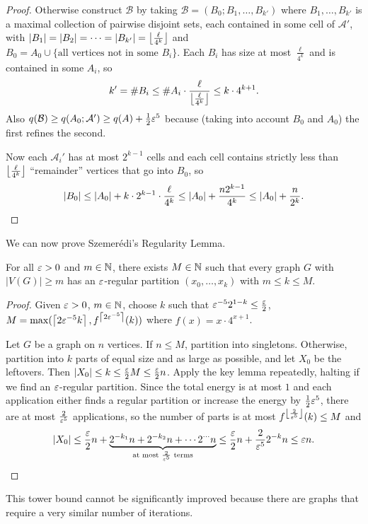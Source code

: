 \documentclass[main.tex]{subfiles}
\begin{document}
\begin{proof}
  Otherwise construct $\mathcal B$ by taking
  $\mathcal B = (B_0; B_1,\ldots,B_{k'})$ where $B_1,\ldots,B_{k'}$ is a maximal
  collection of pairwise disjoint sets, each contained in some cell of $\mathcal A'$,
  with $|B_1| = |B_2| = \cdots = |B_{k'}| = \left\lfloor \frac{\ell}{4^k} \right\rfloor$
  and $B_0 = A_0\cup\{\text{all vertices not in some $B_i$}\}$.
  Each $B_i$ has size at most $\frac{\ell}{4^k}$ and is contained in some
  $A_i$, so
  \[
    k' = \# B_i\leq\# A_i\cdot\frac{\ell}{\left\lfloor \frac{\ell}{4^k} \right\rfloor}
    \leq k\cdot 4^{k+1}.
  \]
  Also $q(\mathcal B)\geq q(A_0;\mathcal A')\geq q(A) + \frac{1}{2}\varepsilon^5$ because
  (taking into account $B_0$ and $A_0$) the first refines the second.

  Now each $\mathcal A_i'$ has at most $2^{k-1}$ cells and each cell contains
  strictly less than $\left\lfloor \frac{\ell}{4^k} \right\rfloor$ ``remainder'' vertices that go
  into $B_0$, so
  \[
    |B_0|\leq|A_0| + k\cdot 2^{k-1}\cdot\frac{\ell}{4^k}
    \leq |A_0| + \frac{n 2^{k-1}}{4^k}\leq|A_0| + \frac{n}{2^k}. \qedhere
  \]
\end{proof}
We can now prove Szemer\'edi's Regularity Lemma.
\begin{recall*}
  For all $\varepsilon > 0$ and $m\in\mathbb N$, there exists $M\in\mathbb N$ such that every graph
  $G$ with $|V(G)|\geq m$ has an $\varepsilon$-regular partition
  $(x_0,\ldots,x_k)$ with $m\leq k\leq M$.
\end{recall*}
\begin{proof}
  Given $\varepsilon > 0$, $m\in\mathbb N$, choose $k$ such that $\varepsilon^{-5}2^{1-k}\leq\frac{\varepsilon}{2}$,
  $M = \max(\left\lceil 2\varepsilon^{-5}k \right\rceil, f^{\left\lceil 2\varepsilon^{-5} \right\rceil}(k))$ where
  $f(x) = x\cdot 4^{x+1}$.

  Let $G$ be a graph on $n$ vertices.
  If $n\leq M$, partition into singletons.
  Otherwise, partition into $k$ parts of equal size and as large as possible,
  and let $X_0$ be the leftovers.
  Then $|X_0|\leq k\leq\frac{\varepsilon}{2} M\leq\frac{\varepsilon}{2}n$.
  Apply the key lemma repeatedly, halting if we find an $\varepsilon$-regular partition.
  Since the total energy is at most $1$ and each application either
  finds a regular partition or increase the energy by $\frac{1}{2}\varepsilon^5$, there are
  at most $\frac{2}{\varepsilon^5}$ applications, so the number of parts is at most
  $f^{\left\lfloor \frac{2}{\varepsilon^5} \right\rfloor}(k)\leq M$ and
  \[
    |X_0|\leq\frac{\varepsilon}{2}n
    + \underbrace{2^{-k_1}n + 2^{-k_2}n + \cdots 2^{\cdots} n}_{\text{at most $\frac{2}{\varepsilon^5}$ terms}}
    \leq\frac{\varepsilon}{2}n + \frac{2}{\varepsilon^5}2^{-k}n\leq\varepsilon n. \qedhere
  \]
\end{proof}
\begin{remark*}
  This tower bound cannot be significantly improved because there are
  graphs that require a very similar number of iterations.
\end{remark*}
\end{document}
